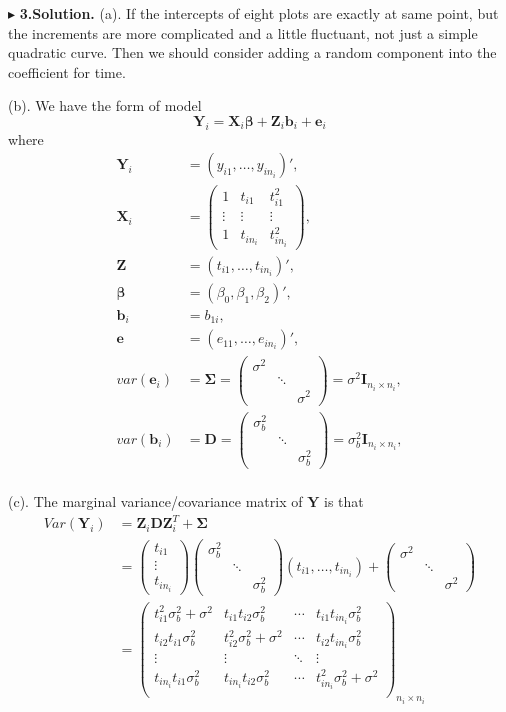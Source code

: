 \documentclass[letterpaper, 12pt]{article}
\newcommand{\ba}{$$\begin{aligned}}
\newcommand{\ea}{\end{aligned}$$}
\begin{document}
$\blacktriangleright$ \textbf{3.\quad Solution.} 
(a). If the intercepts of eight plots are exactly at same point, but the increments are more complicated and a little fluctuant, not just a simple quadratic curve. Then we should consider adding a random component into the coefficient for time.

(b). We have the form of model 
$$
\bm{Y}_i=\bm{X}_i\bm{\beta}+\bm{Z}_i\bm{b}_i+\bm{e}_i
$$
where 
\ba
\bm{Y}_i&=(y_{i1},\dots,y_{in_i})',\\
\bm{X}_i&=\left(\begin{matrix}
1&t_{i1}&t_{i1}^2\\
\vdots&\vdots&\vdots\\
1&t_{in_i}&t_{in_i}^2\end{matrix}\right),\\
\bm{Z}&=(t_{i1},\dots,t_{in_i})',\\
\bm{\beta}&=(\beta_0,\beta_1,\beta_2)',\\
\bm{b}_i&=b_{1i},\\
\bm{e}&=(e_{11},\dots,e_{in_i})',\\
var(\bm{e}_i)&=\bm{\Sigma}=\left(\begin{matrix}
\sigma^2\\
&\ddots\\
&&\sigma^2\end{matrix}\right)=\sigma^2\bm{I}_{n_i\times n_i},\\
var(\bm{b}_i)&=\bm{D}=\left(\begin{matrix}
\sigma_b^2\\
&\ddots\\
&&\sigma_b^2\end{matrix}\right)=\sigma_b^2\bm{I}_{n_i\times n_i},\\
\ea


(c). The marginal variance/covariance matrix of $\bm{Y}$ is that
\ba
Var(\bm{Y}_i)&=\bm{Z}_i\bm{DZ}_i^T+\bm{\Sigma}\\
&=\left(\begin{matrix}
t_{i1}\\
\vdots\\
t_{in_i}\end{matrix}\right)
\left(\begin{matrix}
\sigma_b^2\\
&\ddots\\
&&\sigma_b^2\end{matrix}\right)
(t_{i1},\dots,t_{in_i})+\left(\begin{matrix}
\sigma^2\\
&\ddots\\
&&\sigma^2\end{matrix}\right)\\
&=\left(\begin{matrix}
t_{i1}^2\sigma_b^2+\sigma^2&t_{i1}t_{i2}\sigma_b^2&\cdots&t_{i1}t_{in_i}\sigma_b^2\\
t_{i2}t_{i1}\sigma_b^2&t_{i2}^2\sigma_b^2+\sigma^2&\cdots&t_{i2}t_{in_i}\sigma_b^2\\
\vdots&\vdots&\ddots&\vdots\\
t_{in_i}t_{i1}\sigma_b^2&t_{in_i}t_{i2}\sigma_b^2&\cdots&t_{in_i}^2\sigma_b^2+\sigma^2\\
\end{matrix}\right)_{n_i\times n_i}
\ea
\end{document}
